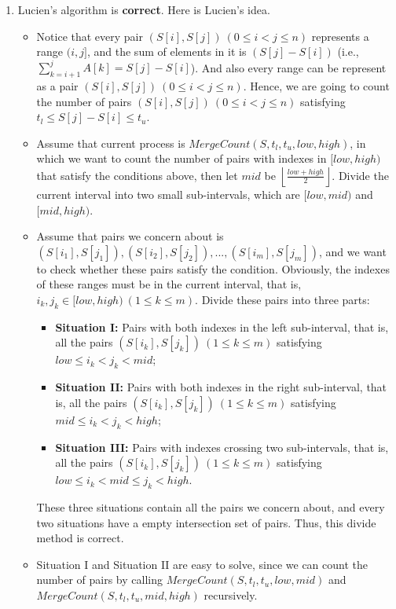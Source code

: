\documentclass[12pt,a4paper]{article}
\makeatletter
\newtheorem*{solution}{Solution}
\theoremstyle{definition}
\renewenvironment{solution}[1][Solution] {\par\pushQED{\qed}\normalfont\topsep6\p@\@plus6\p@\relax\trivlist\item[\hskip\labelsep\bfseries#1\@addpunct{.}]\ignorespaces}{\popQED\endtrivlist\@endpefalse} \makeatother
\makeatother
\begin{document}
\begin{enumerate}
    \begin{solution}
        Lucien's algorithm is \textbf{correct}. Here is Lucien's idea.
        \begin{itemize}
        \item Notice that every pair $(S[i], S[j])\ (0 \leq i < j \leq n)$ represents a range $(i, j]$, and the sum of elements in it is $(S[j] - S[i])$ (i.e., $\sum_{k=i+1}^j A[k] = S[j] - S[i]$). And also every range can be represent as a pair $(S[i], S[j])\ (0 \leq i < j \leq n)$. Hence, we are going to count the number of pairs $(S[i], S[j])\ (0 \leq i < j \leq n)$ satisfying $t_l \leq S[j] - S[i] \leq t_u$.
        \item Assume that current process is $MergeCount(S, t_l, t_u, low, high)$, in which we want to count the number of pairs with indexes in $[low, high)$ that satisfy the conditions above, then let $mid$ be $\left\lfloor \frac{low + high}{2} \right\rfloor$. Divide the current interval into two small sub-intervals, which are $[low, mid)$ and $[mid, high)$.
        \item Assume that pairs we concern about is $(S[i_1], S[j_1]), (S[i_2], S[j_2]), ..., (S[i_m], S[j_m])$, and we want to check whether these pairs satisfy the condition. Obviously, the indexes of these ranges must be in the current interval, that is, $i_k, j_k \in [low, high) \ (1 \leq k \leq m)$. Divide these pairs into three parts:
        \begin{itemize}
        \item \textbf{Situation I:} Pairs with both indexes in the left sub-interval, that is, all the pairs $(S[i_k], S[j_k])\ (1 \leq k \leq m)$ satisfying $low \leq i_k < j_k < mid$;
        \item \textbf{Situation II:} Pairs with both indexes in the right sub-interval, that is, all the pairs $(S[i_k], S[j_k])\ (1 \leq k \leq m)$ satisfying $mid \leq i_k < j_k < high$;
        \item \textbf{Situation III:} Pairs with indexes crossing two sub-intervals, that is, all the pairs $(S[i_k], S[j_k])\ (1 \leq k \leq m)$ satisfying $low \leq i_k < mid \leq j_k < high$.
        \end{itemize}
            These three situations contain all the pairs we concern about, and every two situations have a empty intersection set of pairs. Thus, this divide method is correct.
        \item Situation I and Situation II are easy to solve, since we can count the number of pairs by calling $MergeCount(S, t_l, t_u, low, mid)$ and $MergeCount(S, t_l, t_u, mid, high)$ recursively.

\end{itemize}
\end{solution}
\end{enumerate}
\end{document}
